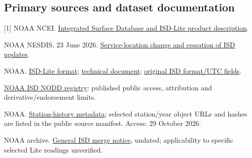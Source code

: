 \documentclass[10pt,letterpaper]{article}
\begin{document}
\subsection*{Primary sources and dataset documentation}
{\footnotesize
[1] NOAA NCEI. \href{https://www.ncei.noaa.gov/products/land-based-station/integrated-surface-database}{Integrated Surface Database and ISD-Lite product description}.\par
[2] NOAA NESDIS, 23 June 2026. \href{https://www.nesdis.noaa.gov/news/service-location-change-integrated-surface-data-global-hourly}{Service-location change and cessation of ISD updates}.\par
[3] NOAA. \href{https://noaa-isd-pds.s3.amazonaws.com/isd-lite/isd-lite-format.txt}{ISD-Lite format}; \href{https://noaa-isd-pds.s3.amazonaws.com/isd-lite/isd-lite-technical-document.txt}{technical document}; \href{https://noaa-isd-pds.s3.amazonaws.com/isd-format-document.pdf}{original ISD format/UTC fields}.\par
[4] \href{https://registry.opendata.aws/noaa-isd/}{NOAA ISD NODD registry}: published public access, attribution and derivative/endorsement limits.\par
[5] NOAA. \href{https://noaa-isd-pds.s3.amazonaws.com/isd-history.csv}{Station-history metadata}; selected station/year object URLs and hashes are listed in the public source manifest. Access: 29 October 2026.\par
[6] NOAA archive. \href{https://noaa-isd-pds.s3.amazonaws.com/NOTICE-ISD-MERGE-ISSUE.TXT}{General ISD merge notice}, undated; applicability to specific selected Lite readings unverified.\par
}
\end{document}
